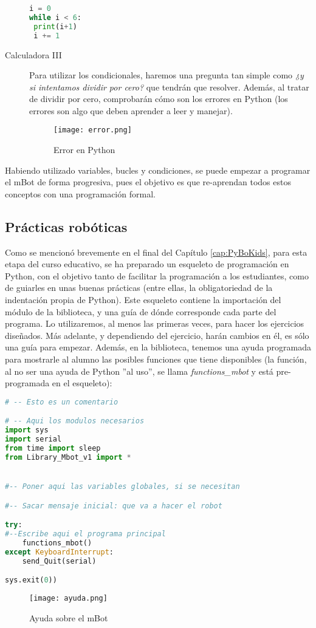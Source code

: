 \begin{description}
\begin{lstlisting}[language=python]
i = 0
while i < 6:
 print(i+1)
 i += 1
\end{lstlisting}
\item [Calculadora III] Para utilizar los condicionales, haremos una pregunta tan simple como \textit{¿y si intentamos dividir por cero?} que tendrán que resolver. Además, al tratar de dividir por cero, comprobarán cómo son los errores en Python (los errores son algo que deben aprender a leer y manejar).
\begin{figure}[H]
	\texttt{[image: error.png]}
	\centering
	\label{img:error}
	\caption{Error en Python}
\end{figure}
\end{description}

Habiendo utilizado variables, bucles y condiciones, se puede empezar a programar el mBot de forma progresiva, pues el objetivo es que re-aprendan todos estos conceptos con una programación formal.
\subsection{Prácticas robóticas}
Como se mencionó brevemente en el final del Capítulo \ref{cap:PyBoKids}, para esta etapa del curso educativo, se ha preparado un esqueleto de programación en Python, con el objetivo tanto de facilitar la programación a los estudiantes, como de guiarles en unas buenas prácticas (entre ellas, la obligatoriedad de la indentación propia de Python). Este esqueleto contiene la importación del módulo de la biblioteca, y una guía de dónde corresponde cada parte del programa. Lo utilizaremos, al menos las primeras veces, para hacer los ejercicios diseñados. Más adelante, y dependiendo del ejercicio, harán cambios en él, es sólo una guía para empezar. Además, en la biblioteca, tenemos una ayuda programada para mostrarle al alumno las posibles funciones que tiene disponibles (la función, al no ser una ayuda de Python ''al uso'', se llama \textit{functions\_mbot} y está pre-programada en el esqueleto):

\begin{lstlisting}[language=python]
# -- Esto es un comentario

# -- Aqui los modulos necesarios
import sys
import serial
from time import sleep
from Library_Mbot_v1 import *


#-- Poner aqui las variables globales, si se necesitan

#-- Sacar mensaje inicial: que va a hacer el robot

try:
#--Escribe aqui el programa principal
	functions_mbot()
except KeyboardInterrupt:
	send_Quit(serial)

sys.exit(0))
\end{lstlisting}
\begin{figure}[H]
	\texttt{[image: ayuda.png]}
	\centering
	\label{img:ayuda}
	\caption{Ayuda sobre el mBot}
\end{figure}


